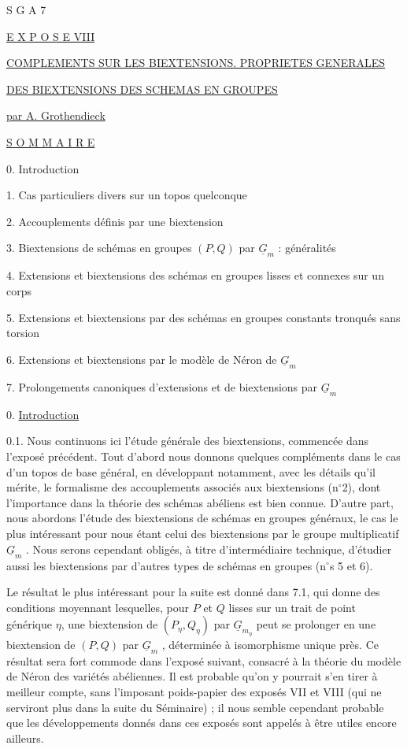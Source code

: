 


S G A 7


\underline{E X P O S E  VIII}


\underline{\underline{COMPLEMENTS SUR LES BIEXTENSIONS. PROPRIETES GENERALES}}


\underline{\underline{DES BIEXTENSIONS DES SCHEMAS EN GROUPES}}

\underline{par A. Grothendieck}


\underline{S O M M A I R E}

0. Introduction

1. Cas particuliers divers sur un topos quelconque

2. Accouplements définis par une biextension

3. Biextensions de schémas en groupes $(P,Q)$ par $\underline{G}_m$ : généralités

4. Extensions et biextensions des schémas en groupes lisses et connexes sur un corps

5. Extensions et biextensions par des schémas en groupes constants tronqués sans torsion

6. Extensions et biextensions par le modèle de Néron de $\underline{G}_m$

7. Prolongements canoniques d'extensions et de biextensions par $\underline{G}_m$


0. \underline{Introduction}

0.1.  Nous continuons ici l'étude générale des biextensions, commencée dans l'exposé précédent. Tout d'abord nous donnons quelques compléments dans le cas d'un topos de base général, en développant notamment, avec les détails qu'il mérite, le formalisme des accouplements associés aux biextensions (n$^{\circ}$2), dont l'importance dans la théorie des schémas abéliens est bien connue. D'autre part, nous abordons l'étude des biextensions de schémas en groupes généraux, le cas le plus intéressant pour nous étant celui des biextensions par le groupe multiplicatif $\underline{G}_m$ . Nous serons cependant obligés, à titre d'intermédiaire technique, d'étudier aussi les biextensions par d'autres types de schémas en groupes (n$^{\circ}$s 5 et 6).



Le résultat le plus intéressant pour la suite est donné dans 7.1, qui donne des conditions moyennant lesquelles, pour $P$ et $Q$ lisses sur un trait de point générique $\eta$, une biextension de $(P_\eta,Q_\eta)$ par $\underline{G}_{m_\eta}$ peut se prolonger en une biextension de $(P,Q)$ par $\underline{G}_m$ , déterminée à isomorphisme unique près. Ce résultat sera fort commode dans l'exposé suivant, consacré à la théorie du modèle de Néron des variétés abéliennes. Il est probable qu'on y pourrait s'en tirer à meilleur compte, sans l'imposant poids-papier des exposés VII et VIII (qui ne serviront plus dans la suite du Séminaire) ; il nous semble cependant probable que les développements donnés dans ces exposés sont appelés à être utiles encore ailleurs.

